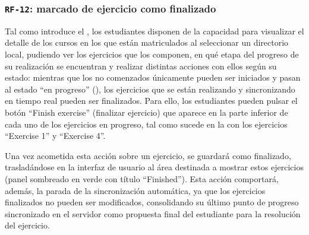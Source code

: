 \subsubsection{\texttt{RF-12}: marcado de ejercicio como finalizado}
\label{subsec:rf12}

Tal como introduce el , los estudiantes disponen de la capacidad para visualizar el detalle de los cursos en los que están matriculados al seleccionar un directorio local, pudiendo ver los ejercicios que los componen, en qué etapa del progreso de su realización se encuentran y realizar distintas acciones con ellos según su estado: mientras que los no comenzados únicamente pueden ser iniciados y pasan al estado ``en progreso'' (), los ejercicios que se están realizando y sincronizando en tiempo real pueden ser finalizados. Para ello, los estudiantes pueden pulsar el botón ``Finish exercise'' (finalizar ejercicio) que aparece en la parte inferior de cada uno de los ejercicios en progreso, tal como sucede en la  con los ejercicios ``Exercise 1'' y ``Exercise 4''.

Una vez acometida esta acción sobre un ejercicio, se guardará como finalizado, trasladándose en la interfaz de usuario al área destinada a mostrar estos ejercicios (panel sombreado en verde con título ``Finished''). Esta acción comportará, además, la parada de la sincronización automática, ya que los ejercicios finalizados no pueden ser modificados, consolidando su último punto de progreso sincronizado en el servidor como propuesta final del estudiante para la resolución del ejercicio.

